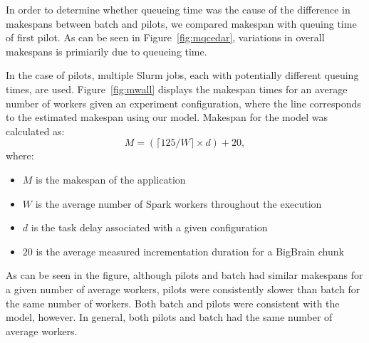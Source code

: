 \documentclass{IEEEtran}
\begin{document}
In order to determine whether queueing time was the cause of the difference 
in makespans between batch and pilots, we compared makespan with queuing time of 
first pilot. As can be seen in Figure~\ref{fig:mqcedar}, variations in overall
makespans is primiarily due to queueing time.

In the case of pilots, multiple Slurm jobs, each with potentially different queuing times,
are used. Figure~\ref{fig:mwall} displays the makespan times for an average number of workers
given an experiment configuration, where the line corresponds to the estimated makespan using 
our model. Makespan for the model was calculated as:
$$
M = (\lceil 125/W \rceil\times d) + 20,
$$
where:
\begin{itemize}
    \item $M$ is the makespan of the application
    \item $W$ is the average number of Spark workers throughout the execution
    \item $d$ is the task delay associated with a given configuration
    \item $20$ is the average measured incrementation duration for a BigBrain chunk
\end{itemize}
As can be seen in the figure, although pilots and batch had similar makespans
for a given number of average workers, pilots were consistently slower than batch
for the same number of workers. Both batch and pilots were consistent with the 
model, however. In general, both pilots and batch had the same number of average
workers.

\end{document}
